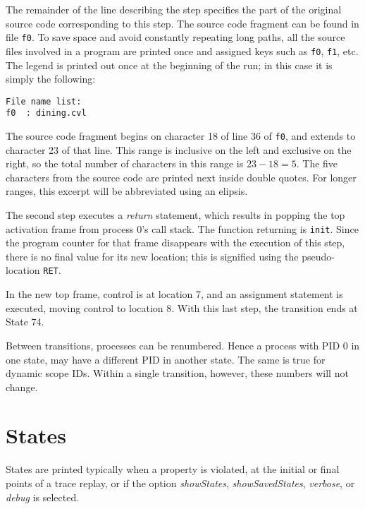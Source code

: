 The remainder of the line describing the step specifies the part of
the original source code corresponding to this step.  The source code
fragment can be found in file \texttt{f0}.  To save space and avoid
constantly repeating long paths, all the source files involved in a
program are printed once and assigned keys such as \texttt{f0},
\texttt{f1}, etc.  The legend is printed out once at the beginning of
the run; in this case it is simply the following:
\begin{verbatim}
File name list:
f0	: dining.cvl
\end{verbatim}
The source code fragment begins on character 18 of line 36 of
\texttt{f0}, and extends to character 23 of that line.  This range is
inclusive on the left and exclusive on the right, so the total number
of characters in this range is $23-18=5$.  The five characters from
the source code are printed next inside double quotes.  For longer
ranges, this excerpt will be abbreviated using an elipsis.

The second step executes a \emph{return} statement, which results in
popping the top activation frame from process 0's call stack. The
function returning is \texttt{init}.  Since the program counter for
that frame disappears with the execution of this step, there is no
final value for its new location; this is signified using the
pseudo-location \texttt{RET}.

In the new top frame, control is at location 7, and an assignment
statement is executed, moving control to location 8.  With this last
step, the transition ends at State 74.

Between transitions, processes can be renumbered.  Hence a process
with PID 0 in one state, may have a different PID in another state.
The same is true for dynamic scope IDs.  Within a single transition,
however, these numbers will not change.

\section{States}

States are printed typically when a property is violated, at the
initial or final points of a trace replay, or if the option
\emph{showStates}, \emph{showSavedStates}, \emph{verbose}, or
\emph{debug} is selected.

